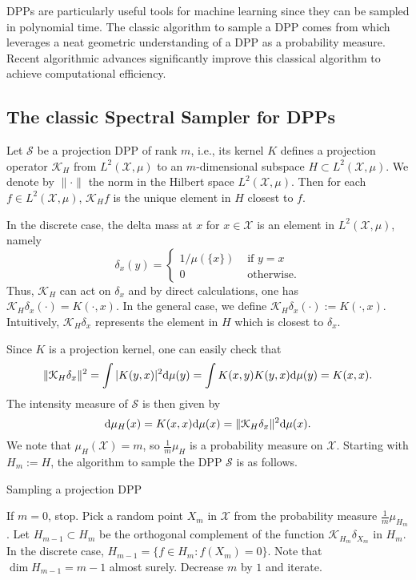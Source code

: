 
DPPs are particularly useful tools for machine learning since they can be sampled in polynomial time. The classic algorithm to sample a DPP comes from \cite{HKPV} which leverages a neat geometric understanding of a DPP as a probability measure. Recent algorithmic advances significantly improve this classical algorithm to achieve computational efficiency. 

\subsection{The classic Spectral Sampler for DPPs} \label{sec:HKPV}

Let $\mathcal S$ be a projection DPP of rank $m$, i.e., its kernel $K$ defines a projection operator $\mathcal K_H$ from $L^2(\mathcal X,\mu)$ to an $m$-dimensional subspace $H \subset L^2(\mathcal X,\mu)$. We denote by $\|\cdot\|$ the norm in the Hilbert space $L^2(\mathcal X,\mu)$. Then for each $f\in L^2(\mathcal X,\mu)$, $\mathcal K_H f$ is the unique element in $H$ closest to $f$.

In the discrete case, the delta mass at $x$ for $x\in \mathcal X$ is an element in $L^2(\mathcal X,\mu)$, namely
\[  \delta_x (y) = \begin{cases} 
    1/\mu(\{x\}) & \text{ if } y = x \\
    0 & \text{ otherwise.}
\end{cases}\]
Thus, $\mathcal K_H$ can act on $\delta_x$ and by direct calculations, one has $\mathcal K_H \delta_x (\cdot ) = K(\cdot ,x)$. In the general case,
we define $\mathcal K_H \delta_x (\cdot) := K(\cdot, x)$. Intuitively, $\mathcal K_H \delta_x$ represents the element in $H$ which is closest to $\delta_x$.

Since $K$ is a projection kernel, one can easily check that
\[ \| \mathcal K_H\delta_x\|^2 = \int |K(y,x)|^2 \mathrm{d} \mu(y) = \int K(x,y) K(y,x) \mathrm{d} \mu(y) = K(x,x).\]
The intensity measure of $\mathcal S$ is then given by
\[ \mathrm{d} \mu_H(x) = K(x,x) \mathrm{d} \mu(x) = \|\mathcal K_H\delta_x\|^2 \mathrm{d} \mu(x).\]
We note that $\mu_H(\mathcal X) = m$, so $\frac{1}{m}\mu_H$ is a probability measure on $\mathcal X$. Starting with $H_m := H$, the algorithm to sample the DPP $\mathcal S$ is as follows.

\begin{algorithm} [H] \label{alg:HKPV}
\caption{Sampling a projection DPP}
\begin{algorithmic}[1]
    \State If $m=0$, stop.
    \State Pick a random point $X_m$ in $\mathcal X$ from the probability measure $\frac{1}{m}\mu_{H_m}$.
    \State Let $H_{m-1} \subset H_m$ be the orthogonal complement of the function $\mathcal K_{H_m}\delta_{X_m}$ in $H_m$. In the discrete case, $H_{m-1} = \{f\in H_m : f(X_m) =0 \}.$ Note that $\dim H_{m-1} = m-1$ almost surely. 
    \State Decrease $m$ by $1$ and iterate.
\end{algorithmic}
\end{algorithm}

